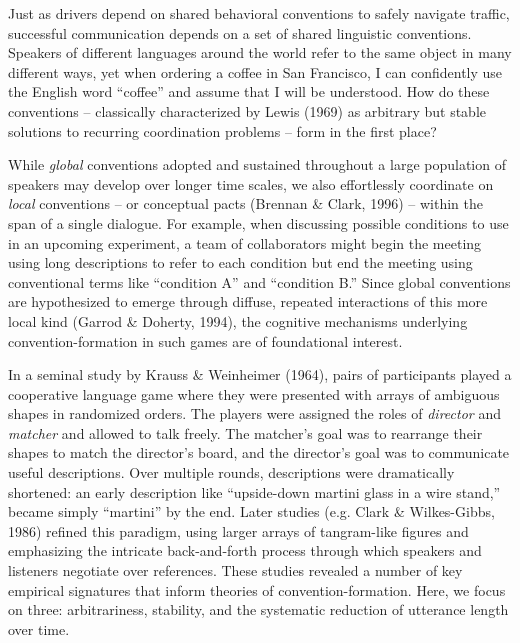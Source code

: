\documentclass[manuscript]{stjour}
\begin{document}
Just as drivers depend on shared behavioral conventions to safely
navigate traffic, successful communication depends on a set of shared
linguistic conventions. Speakers of different languages around the world
refer to the same object in many different ways, yet when ordering a
coffee in San Francisco, I can confidently use the English word
``coffee'' and assume that I will be understood. How do these
conventions -- classically characterized by Lewis (1969) as arbitrary
but stable solutions to recurring coordination problems -- form in the
first place?

While \emph{global} conventions adopted and sustained throughout a large
population of speakers may develop over longer time scales, we also
effortlessly coordinate on \emph{local} conventions -- or conceptual
pacts (Brennan \& Clark, 1996) -- within the span of a single dialogue.
For example, when discussing possible conditions to use in an upcoming
experiment, a team of collaborators might begin the meeting using long
descriptions to refer to each condition but end the meeting using
conventional terms like ``condition A'' and ``condition B.'' Since
global conventions are hypothesized to emerge through diffuse, repeated
interactions of this more local kind (Garrod \& Doherty, 1994), the
cognitive mechanisms underlying convention-formation in such games are
of foundational interest.

In a seminal study by Krauss \& Weinheimer (1964), pairs of participants
played a cooperative language game where they were presented with arrays
of ambiguous shapes in randomized orders. The players were assigned the
roles of \emph{director} and \emph{matcher} and allowed to talk freely.
The matcher's goal was to rearrange their shapes to match the director's
board, and the director's goal was to communicate useful descriptions.
Over multiple rounds, descriptions were dramatically shortened: an early
description like ``upside-down martini glass in a wire stand,'' became
simply ``martini'' by the end. Later studies (e.g. Clark \&
Wilkes-Gibbs, 1986) refined this paradigm, using larger arrays of
tangram-like figures and emphasizing the intricate back-and-forth
process through which speakers and listeners negotiate over references.
These studies revealed a number of key empirical signatures that inform
theories of convention-formation. Here, we focus on three:
arbitrariness, stability, and the systematic reduction of utterance
length over time.
\end{document}
